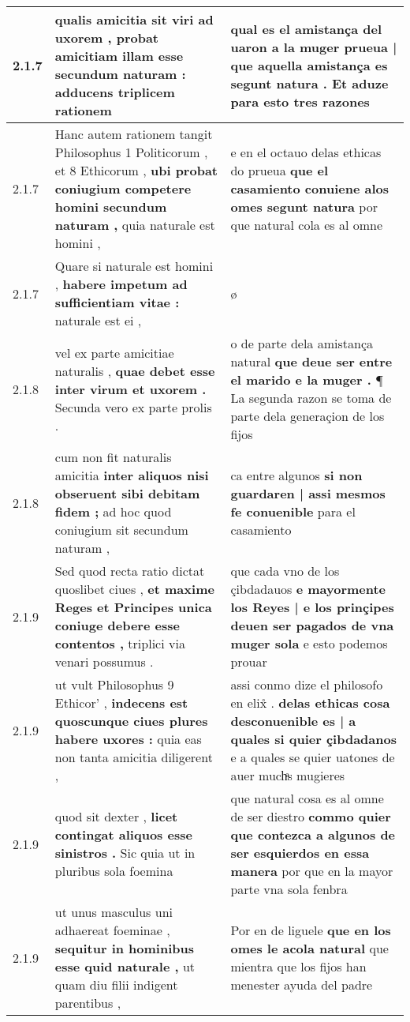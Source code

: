 \begin{tabular}{|p{1cm}|p{6.5cm}|p{6.5cm}|}
2.1.7 & qualis amicitia sit viri ad uxorem , \textbf{ probat amicitiam illam esse secundum naturam : } adducens triplicem rationem & qual es el amistança del uaron \textbf{ a la muger prueua | que aquella amistança es segunt natura . } Et aduze para esto tres razones \\\hline
2.1.7 & Hanc autem rationem tangit Philosophus 1 Politicorum , et 8 Ethicorum , \textbf{ ubi probat coniugium competere homini secundum naturam , } quia naturale est homini , & e en el octauo delas ethicas do prueua \textbf{ que el casamiento conuiene alos omes segunt natura } por que natural cola es al omne \\\hline
2.1.7 & Quare si naturale est homini , \textbf{ habere impetum ad sufficientiam vitae : } naturale est ei , & ø \\\hline
2.1.8 & vel ex parte amicitiae naturalis , \textbf{ quae debet esse inter virum et uxorem . } Secunda vero ex parte prolis . & o de parte dela amistança natural \textbf{ que deue ser entre el marido e la muger . } ¶ La segunda razon se toma de parte dela generaçion de los fijos \\\hline
2.1.8 & cum non fit naturalis amicitia \textbf{ inter aliquos nisi obseruent sibi debitam fidem ; } ad hoc quod coniugium sit secundum naturam , & ca entre algunos \textbf{ si non guardaren | assi mesmos fe conuenible } para el casamiento \\\hline
2.1.9 & Sed quod recta ratio dictat quoslibet ciues , \textbf{ et maxime Reges et Principes unica coniuge debere esse contentos , } triplici via venari possumus . & que cada vno de los çibdadauos \textbf{ e mayormente los Reyes | e los prinçipes deuen ser pagados de vna muger sola } e esto podemos prouar \\\hline
2.1.9 & ut vult Philosophus 9 Ethicor’ , \textbf{ indecens est quoscunque ciues plures habere uxores : } quia eas non tanta amicitia diligerent , & assi conmo dize el philosofo en elix̊ . \textbf{ delas ethicas cosa desconuenible es | a quales si quier çibdadanos } e a quales se quier uatones de auer muchͣs mugieres \\\hline
2.1.9 & quod sit dexter , \textbf{ licet contingat aliquos esse sinistros . } Sic quia ut in pluribus sola foemina & que natural cosa es al omne de ser diestro \textbf{ commo quier que contezca a algunos de ser esquierdos en essa manera } por que en la mayor parte vna sola fenbra \\\hline
2.1.9 & ut unus masculus uni adhaereat foeminae , \textbf{ sequitur in hominibus esse quid naturale , } ut quam diu filii indigent parentibus , & Por en de liguele \textbf{ que en los omes le acola natural } que mientra que los fijos han menester ayuda del padre \\\hline

\end{tabular}
